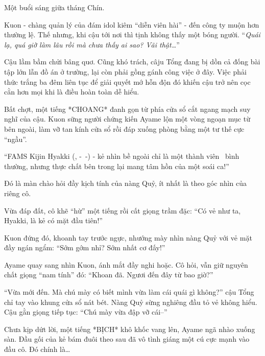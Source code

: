 \documentclass[../main.tex]{subfiles}
\begin{document}

Một buổi sáng giữa tháng Chín.

Kuon - chàng quản lý của đám idol kiêm ``diễn viên hài'' - đến công ty muộn hơn thường lệ. Thế nhưng, khi cậu tới nơi thì tịnh không thấy một bóng người. ``\textit{Quái lạ, quá giờ làm lâu rồi mà chưa thấy ai sao? Vãi thật\dots}''

Cậu lầm bầm chửi bâng quơ. Cũng khó trách, câju Tổng đang bị dồn cả đống bài tập lớn lẫn đồ án ở trường, lại còn phải gồng gánh công việc ở đây. Việc phải thức trắng ba đêm liên tục để giải quyết mớ hỗn độn đó khiến cậu trở nên cọc cằn hơn mọi khi là điều hoàn toàn dễ hiểu.


Bất chợt, một tiếng *CHOANG* đanh gọn từ phía cửa sổ cắt ngang mạch suy nghĩ của cậu. Kuon sững người chứng kiến Ayame lộn một vòng ngoạn mục từ bên ngoài, làm vỡ tan kính cửa sổ rồi đáp xuống phòng bằng một tư thế cực ``ngầu''.


``FAMS Kijin Hyakki (, -\ -) - kẻ nhìn bề ngoài chỉ là một thành viên \hll\  bình thường, nhưng thực chất bên trong lại mang tâm hồn của một soái ca!''

Đó là màn chào hỏi đầy kịch tính của nàng Quỷ, ít nhất là theo góc nhìn của riêng cô.

Vừa đáp đất, cô khẽ ``hừ'' một tiếng rồi cất giọng trầm đặc: ``Có vẻ như ta, Hyakki, là kẻ có mặt đầu tiên!''

Kuon đứng đó, khoanh tay trước ngực, nhướng mày nhìn nàng Quỷ với vẻ mặt đầy ngán ngẩm: ``Sớm gớm nhỉ? Sớm nhất cơ đấy!''

Ayame quay sang nhìn Kuon, ánh mắt đầy nghi hoặc. Cô hỏi, vẫn giữ nguyên chất giọng ``nam tính'' đó: ``Khoan đã. Ngươi đến đây từ bao giờ?''

``Vừa mới đến. Mà chú mày có biết mình vừa làm cái quái gì không?'' cậu Tổng chỉ tay vào khung cửa sổ nát bét. Nàng Quỷ  sừng nghiêng đầu tỏ vẻ không hiểu. Cậu gằn giọng tiếp tục: ``Chú mày vừa đập vỡ cái--''

Chưa kịp dứt lời, một tiếng *BỊCH* khô khốc vang lên, Ayame ngã nhào xuống sàn. Đầu gối của kẻ bám đuôi theo sau đã vô tình giáng một cú cực mạnh vào đầu cô. Đó chính là\dots
\end{document}
